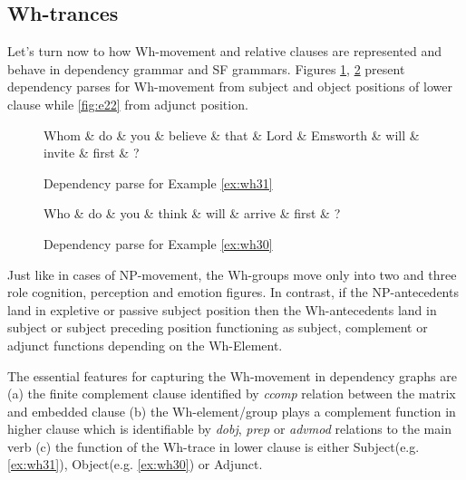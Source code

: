 \subsection{Wh-trances}
Let's turn now to how Wh-movement and relative clauses are represented and behave in dependency grammar and SF grammars. Figures \ref{fig:e18}, \ref{fig:e19} present dependency parses for  Wh-movement from subject and object positions of lower clause while \ref{fig:e22} from adjunct position.

\begin{figure}[H]
	\centering
	\begin{dependency}
		\begin{deptext}[]
			Whom \& do \& you \& believe \& that \& Lord \& Emsworth \& will \& invite \& first \& ?\\
		\end{deptext}
	\end{dependency}
	\caption{Dependency parse for Example \ref{ex:wh31}}
	\label{fig:e18}
\end{figure}
\begin{figure}[H]
	\centering
	\begin{dependency}
		\begin{deptext}[]
			Who \& do \& you \& think \& will \& arrive \& first \& ?\\
		\end{deptext}
	\end{dependency}
	\caption{Dependency parse for Example \ref{ex:wh30}}
	\label{fig:e19}
\end{figure}

Just like in cases of NP-movement, the Wh-groups move only into two and three role cognition, perception and emotion figures. In contrast, if the NP-antecedents land in expletive or passive subject position then the Wh-antecedents land in subject or subject preceding position functioning as subject, complement or adjunct functions depending on the Wh-Element.

The essential features for capturing the Wh-movement in dependency graphs are (a) the finite complement clause identified by \textit{ccomp} relation between the matrix and embedded clause (b) the Wh-element/group plays a complement function in higher clause which is identifiable by \textit{dobj}, \textit{prep} or \textit{advmod} relations to the main verb (c) the function of the Wh-trace in lower clause is either Subject(e.g. \ref{ex:wh31}), Object(e.g. \ref{ex:wh30}) or Adjunct. 

